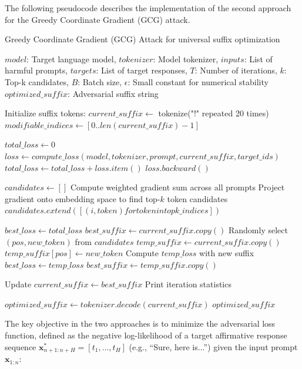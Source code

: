 \documentclass[../main.tex]{subfiles}
\begin{document}
The following pseudocode describes the implementation of the second approach for the Greedy Coordinate Gradient (GCG) attack.
\begin{breakablealgorithm}{Greedy Coordinate Gradient (GCG) Attack for universal suffix optimization}
\begin{algorithmic}[1]
\Require $model$: Target language model, $tokenizer$: Model tokenizer, 
        $inputs$: List of harmful prompts, $targets$: List of target responses,
        $T$: Number of iterations, $k$: Top-k candidates, $B$: Batch size,
        $\epsilon$: Small constant for numerical stability
\Ensure $optimized\_suffix$: Adversarial suffix string

\State Initialize suffix tokens: $current\_suffix \gets$ tokenize("!" repeated 20 times)
\State $modifiable\_indices \gets [0..len(current\_suffix)-1]$ 

    \State $total\_loss \gets 0$
        \State $loss \gets compute\_loss(model, tokenizer, prompt, current\_suffix, target\_ids)$
        \State $total\_loss \gets total\_loss + loss.item()$
        \State $loss.backward()$ 
    \EndFor
    
    \State $candidates \gets []$
        \State Compute weighted gradient sum across all prompts
        \State Project gradient onto embedding space to find top-$k$ token candidates
        \State $candidates.extend([(i, token) for token in topk\_indices])$
    \EndFor
    
    \State $best\_loss \gets total\_loss$
    \State $best\_suffix \gets current\_suffix.copy()$
        \State Randomly select $(pos, new\_token)$ from $candidates$
        \State $temp\_suffix \gets current\_suffix.copy()$
        \State $temp\_suffix[pos] \gets new\_token$
        \State Compute $temp\_loss$ with new suffix
            \State $best\_loss \gets temp\_loss$
            \State $best\_suffix \gets temp\_suffix.copy()$
        \EndIf
    \EndFor
    
    \State Update $current\_suffix \gets best\_suffix$
    \State Print iteration statistics
\EndFor

\State $optimized\_suffix \gets tokenizer.decode(current\_suffix)$
\State \Return $optimized\_suffix$
\end{algorithmic}
\end{breakablealgorithm}
The key objective in the two approaches is to minimize the adversarial loss function, defined as the negative log-likelihood of a target affirmative response sequence \(\mathbf{x}_{n+1:n+H}^* = [t_1, \ldots, t_H]\) (e.g., ``Sure, here is...'') given the input prompt \(\mathbf{x}_{1:n}\):
\end{document}
